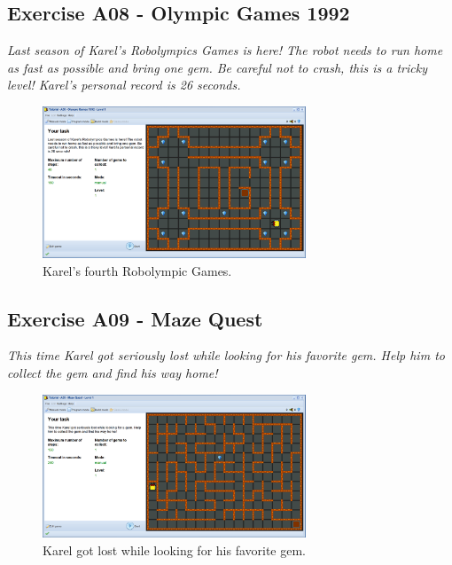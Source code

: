 \documentclass[article,A4,12pt]{llncs}
\begin{document}
\subsection{Exercise A08 - Olympic Games 1992}

{\em Last season of Karel's Robolympics Games is here! The 
robot needs to run home as fast as possible and bring one gem. 
Be careful not to crash, this is a tricky level! Karel's personal record is 26 seconds.}\\[-7mm]

\begin{figure}[!ht]
\begin{center}
\includegraphics[width=0.7\textwidth]{img/a08.png}
\end{center}
\vspace{-4mm}
\caption{Karel's fourth Robolympic Games.}
\label{fig:a08}
\vspace{-4mm}
\end{figure}
\noindent
\newpage

\subsection{Exercise A09 - Maze Quest}

{\em This time Karel got seriously lost while looking for his favorite gem. 
Help him to collect the gem and find his way home!}\\[-7mm]

\begin{figure}[!ht]
\begin{center}
\includegraphics[width=0.7\textwidth]{img/a09.png}
\end{center}
\vspace{-4mm}
\caption{Karel got lost while looking for his favorite gem.}
\label{fig:a09}
\vspace{-4mm}
\end{figure}
\noindent
\end{document}
